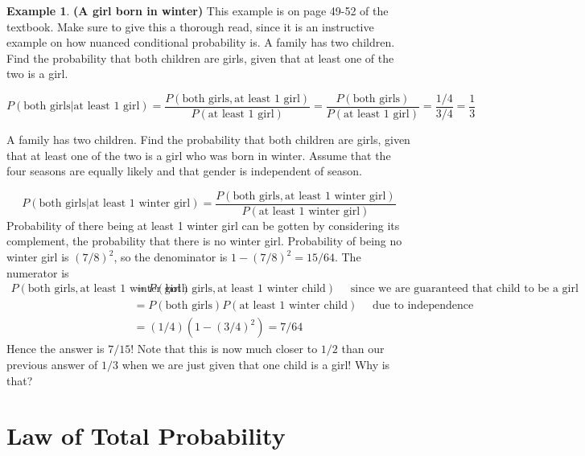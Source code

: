 \documentclass[10pt]{article}
\theoremstyle{definition}
\newtheorem{example}[theo]{\color{Maroon} Example}
\theoremstyle{remark}
\begin{document}
\begin{example} \textbf{(A girl born in winter)} This example is on page 49-52 of the textbook. Make sure to give this a thorough read, since it is an instructive example on how nuanced conditional probability is. A family has two children. Find the probability that both children are girls, given that at least one of the two is a girl.

\medskip 

$$P(\text{both girls}|\text{at least 1 girl}) = \frac{P(\text{both girls},\text{at least 1 girl})}{P(\text{at least 1 girl})} = \frac{P(\text{both girls})}{P(\text{at least 1 girl})} = \frac{1/4}{3/4} = \boxed{\frac{1}{3}}$$

\medskip 

A family has two children. Find the probability that both children are girls, given that at least one of the two is a girl who was born in winter. Assume that the four seasons are equally likely and that gender is independent of season.

\medskip

$$P(\text{both girls}|\text{at least 1 winter girl}) = \frac{P(\text{both girls},\text{at least 1 winter girl})}{P(\text{at least 1 winter girl})} $$ Probability of there being at least 1 winter girl can be gotten by considering its complement, the probability that there is no winter girl. Probability of being no winter girl is $(7/8)^2$, so the denominator is $1-(7/8)^2=15/64$. The numerator is \begin{align*}
    P(\text{both girls},\text{at least 1 winter girl}) & = P(\text{both girls},\text{at least 1 winter child}) \quad \text{ since we are guaranteed that child to be a girl}\\
    & = P(\text{both girls})P(\text{at least 1 winter child}) \quad \text{ due to independence} \\
    & = (1/4) (1- (3/4)^2) = 7/64
\end{align*}
Hence the answer is $7/15$! Note that this is now much closer to $1/2$ than our previous answer of $1/3$ when we are just given that one child is a girl! Why is that?

\vspace{1 in}

\end{example}
	
\section{Law of Total Probability}
\end{document}
